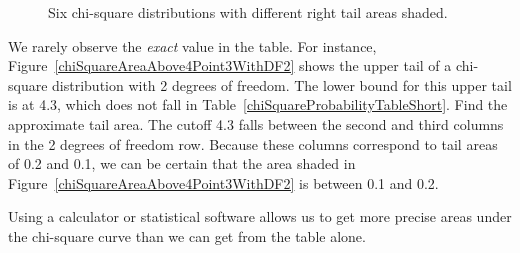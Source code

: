 \begin{figure}
{\label{chiSquareAreaAbove11Point7WithDF7}
}
\caption{\textbf{} Six chi-square distributions with different right tail areas shaded.}
\label{arrayOfFigureAreasForChiSquareDistribution}
\end{figure}

\begin{example}{We rarely observe the \emph{exact} value in the table. For instance, Figure~\ref{chiSquareAreaAbove4Point3WithDF2} shows the upper tail of a chi-square distribution with 2 degrees of freedom. The lower bound for this upper tail is at 4.3, which does not fall in Table~\ref{chiSquareProbabilityTableShort}. Find the approximate tail area.}
The cutoff 4.3 falls between the second and third columns in the 2 degrees of freedom row. Because these columns correspond to tail areas of 0.2 and 0.1, we can be certain that the area shaded in Figure~\ref{chiSquareAreaAbove4Point3WithDF2} is between 0.1 and 0.2.
\end{example}

Using a calculator or statistical software allows us to get more precise areas under the chi-square curve than we can get from the table alone.

